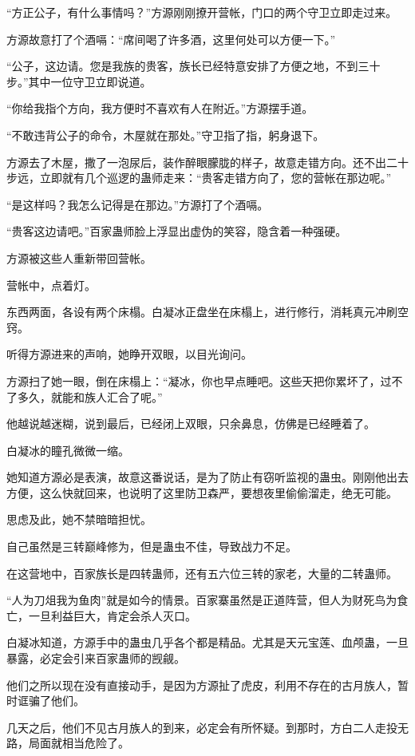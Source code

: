 \begin{this_body}
“方正公子，有什么事情吗？”方源刚刚撩开营帐，门口的两个守卫立即走过来。

方源故意打了个酒嗝：“席间喝了许多酒，这里何处可以方便一下。”

“公子，这边请。您是我族的贵客，族长已经特意安排了方便之地，不到三十步。”其中一位守卫立即说道。

“你给我指个方向，我方便时不喜欢有人在附近。”方源摆手道。

“不敢违背公子的命令，木屋就在那处。”守卫指了指，躬身退下。

方源去了木屋，撒了一泡尿后，装作醉眼朦胧的样子，故意走错方向。还不出二十步远，立即就有几个巡逻的蛊师走来：“贵客走错方向了，您的营帐在那边呢。”

“是这样吗？我怎么记得是在那边。”方源打了个酒嗝。

“贵客这边请吧。”百家蛊师脸上浮显出虚伪的笑容，隐含着一种强硬。

方源被这些人重新带回营帐。

营帐中，点着灯。

东西两面，各设有两个床榻。白凝冰正盘坐在床榻上，进行修行，消耗真元冲刷空窍。

听得方源进来的声响，她睁开双眼，以目光询问。

方源扫了她一眼，倒在床榻上：“凝冰，你也早点睡吧。这些天把你累坏了，过不了多久，就能和族人汇合了呢。”

他越说越迷糊，说到最后，已经闭上双眼，只余鼻息，仿佛是已经睡着了。

白凝冰的瞳孔微微一缩。

她知道方源必是表演，故意这番说话，是为了防止有窃听监视的蛊虫。刚刚他出去方便，这么快就回来，也说明了这里防卫森严，要想夜里偷偷溜走，绝无可能。

思虑及此，她不禁暗暗担忧。

自己虽然是三转巅峰修为，但是蛊虫不佳，导致战力不足。

在这营地中，百家族长是四转蛊师，还有五六位三转的家老，大量的二转蛊师。

“人为刀俎我为鱼肉”就是如今的情景。百家寨虽然是正道阵营，但人为财死鸟为食亡，一旦利益巨大，肯定会杀人灭口。

白凝冰知道，方源手中的蛊虫几乎各个都是精品。尤其是天元宝莲、血颅蛊，一旦暴露，必定会引来百家蛊师的觊觎。

他们之所以现在没有直接动手，是因为方源扯了虎皮，利用不存在的古月族人，暂时诓骗了他们。

几天之后，他们不见古月族人的到来，必定会有所怀疑。到那时，方白二人走投无路，局面就相当危险了。


\end{this_body}
